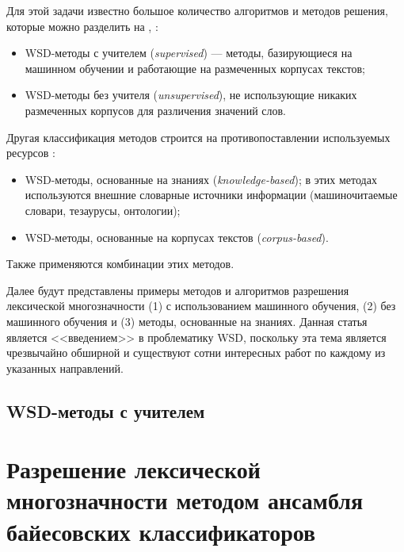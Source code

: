 \documentclass{article}
\begin{document}
\begin{articletext}
Для этой задачи известно большое количество алгоритмов и методов решения, которые можно разделить на \cite{Lukash 2011}, \cite{Navigli 2009}: 

\begin{itemize}
\item WSD-методы с учителем (\textit{supervised}) --- методы, базирующиеся на машинном обучении и работающие на размеченных корпусах текстов; 
\item WSD-методы без учителя (\textit{unsupervised}), не использующие никаких размеченных корпусов для различения значений слов.
\end{itemize}

Другая классификация методов строится на противопоставлении используемых ресурсов \cite{Navigli 2009}:
\begin{itemize}
\item WSD-методы, основанные на знаниях (\textit{knowledge-based}); в этих методах используются внешние словарные источники информации (машиночитаемые словари, тезаурусы, онтологии);
\item WSD-методы, основанные на корпусах текстов (\textit{corpus-based}).
\end{itemize}

Также применяются комбинации этих методов.

Далее будут представлены примеры методов и алгоритмов разрешения лексической многозначности (1) с использованием машинного обучения, (2) без машинного обучения и (3) методы, основанные на знаниях. Данная статья является <<введением>> в проблематику WSD, поскольку эта тема является чрезвычайно обширной и существуют сотни интересных работ по каждому из указанных направлений.

\bfullwidth
\begin{center}
\section{WSD-методы с учителем}
\end{center}
\efullwidth

\section{Разрешение лексической многозначности методом ансамбля байесовских классификаторов}

\begin{flushright}
\end{flushright}


\end{articletext}
\end{document}

